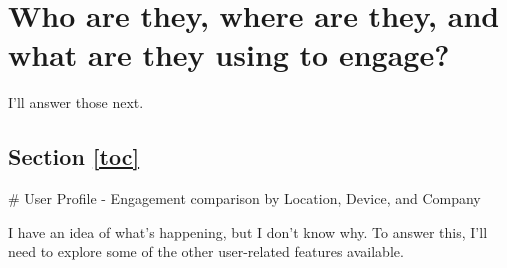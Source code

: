 \documentclass{report}
\begin{document}
\section{Who are they, where are they, and what are they using to
engage?}\label{who-are-they-where-are-they-and-what-are-they-using-to-engage}

I'll answer those next.

\subsection{\texorpdfstring{Section \ref{toc}}{}}\label{back-to-table-of-contents}

 \# User Profile - Engagement comparison by Location, Device, and
Company

I have an idea of what's happening, but I don't know why. To answer
this, I'll need to explore some of the other user-related features
available.
\end{document}
